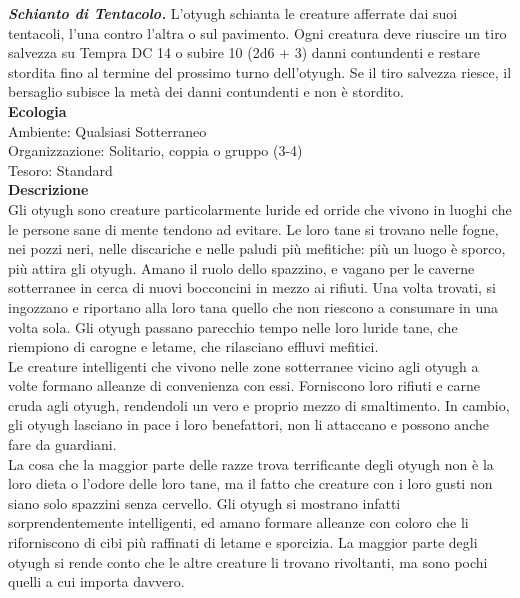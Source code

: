 \begin{multicols}{2}
\emph{\textbf{Schianto di Tentacolo.}} L'otyugh schianta le creature afferrate dai suoi tentacoli, l'una contro l'altra o sul pavimento. Ogni creatura deve riuscire un tiro salvezza su Tempra DC 14 o subire 10 (2d6 + 3) danni contundenti e restare stordita fino al termine del prossimo turno dell'otyugh. Se il tiro salvezza riesce, il bersaglio subisce la metà dei danni contundenti e non è stordito.\\
\textbf{Ecologia}\\
Ambiente: Qualsiasi Sotterraneo\\
Organizzazione: Solitario, coppia o gruppo (3-4)\\
Tesoro: Standard\\
\textbf{Descrizione}\\
Gli otyugh sono creature particolarmente luride ed orride che vivono in luoghi che le persone sane di mente tendono ad evitare. Le loro tane si trovano nelle fogne, nei pozzi neri, nelle discariche e nelle paludi più mefitiche: più un luogo è sporco, più attira gli otyugh. Amano il ruolo dello spazzino, e vagano per le caverne sotterranee in cerca di nuovi bocconcini in mezzo ai rifiuti. Una volta trovati, si ingozzano e riportano alla loro tana quello che non riescono a consumare in una volta sola. Gli otyugh passano parecchio tempo nelle loro luride tane, che riempiono di carogne e letame, che rilasciano effluvi mefitici.\\
Le creature intelligenti che vivono nelle zone sotterranee vicino agli otyugh a volte formano alleanze di convenienza con essi. Forniscono loro rifiuti e carne cruda agli otyugh, rendendoli un vero e proprio mezzo di smaltimento. In cambio, gli otyugh lasciano in pace i loro benefattori, non li attaccano e possono anche fare da guardiani.\\
La cosa che la maggior parte delle razze trova terrificante degli otyugh non è la loro dieta o l’odore delle loro tane, ma il fatto che creature con i loro gusti non siano solo spazzini senza cervello. Gli otyugh si mostrano infatti sorprendentemente intelligenti, ed amano formare alleanze con coloro che li riforniscono di cibi più raffinati di letame e sporcizia. La maggior parte degli otyugh si rende conto che le altre creature li trovano rivoltanti, ma sono pochi quelli a cui importa davvero.\\


\end{multicols}
